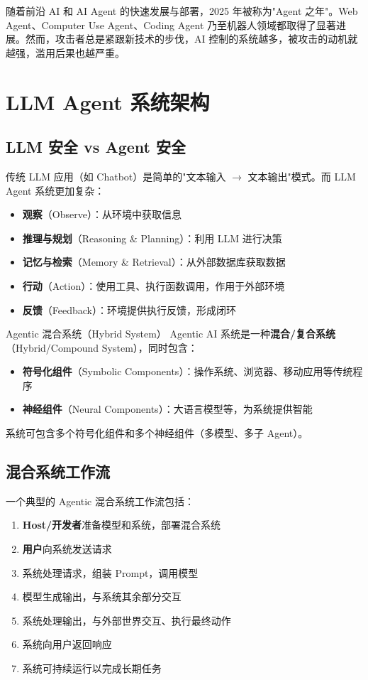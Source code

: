 \documentclass[a4paper]{article}
\begin{document}
随着前沿 AI 和 AI Agent 的快速发展与部署，2025 年被称为"Agent 之年"。Web Agent、Computer Use Agent、Coding Agent 乃至机器人领域都取得了显著进展。然而，攻击者总是紧跟新技术的步伐，AI 控制的系统越多，被攻击的动机就越强，滥用后果也越严重。

\section{LLM Agent 系统架构}

\subsection{LLM 安全 vs Agent 安全}

传统 LLM 应用（如 Chatbot）是简单的"文本输入 $\to$ 文本输出"模式。而 LLM Agent 系统更加复杂：

\begin{itemize}
    \item \textbf{观察}（Observe）：从环境中获取信息
    \item \textbf{推理与规划}（Reasoning \& Planning）：利用 LLM 进行决策
    \item \textbf{记忆与检索}（Memory \& Retrieval）：从外部数据库获取数据
    \item \textbf{行动}（Action）：使用工具、执行函数调用，作用于外部环境
    \item \textbf{反馈}（Feedback）：环境提供执行反馈，形成闭环
\end{itemize}

\begin{importantbox}{Agentic 混合系统（Hybrid System）}
Agentic AI 系统是一种\textbf{混合/复合系统}（Hybrid/Compound System），同时包含：
\begin{itemize}
    \item \textbf{符号化组件}（Symbolic Components）：操作系统、浏览器、移动应用等传统程序
    \item \textbf{神经组件}（Neural Components）：大语言模型等，为系统提供智能
\end{itemize}
系统可包含多个符号化组件和多个神经组件（多模型、多子 Agent）。
\end{importantbox}

\subsection{混合系统工作流}

一个典型的 Agentic 混合系统工作流包括：
\begin{enumerate}
    \item \textbf{Host/开发者}准备模型和系统，部署混合系统
    \item \textbf{用户}向系统发送请求
    \item 系统处理请求，组装 Prompt，调用模型
    \item 模型生成输出，与系统其余部分交互
    \item 系统处理输出，与外部世界交互、执行最终动作
    \item 系统向用户返回响应
    \item 系统可持续运行以完成长期任务
\end{enumerate}
\end{document}
